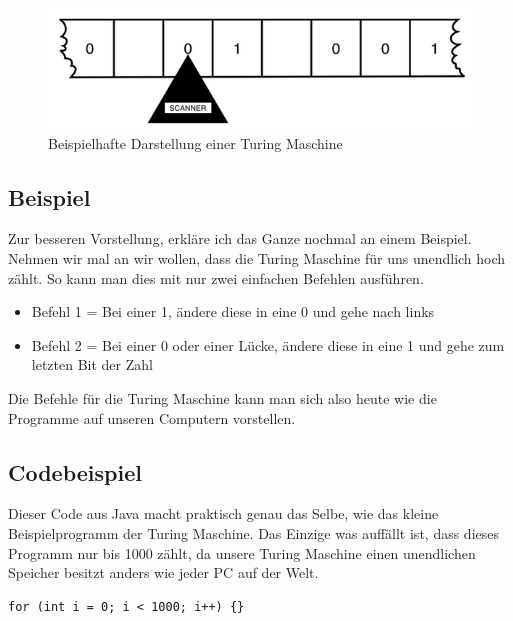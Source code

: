 \begin{figure}[hbtp]
\centering
\includegraphics[scale=1]{TuringmashinePicture.png}
\caption{Beispielhafte Darstellung einer Turing Maschine\cite{theessentialturing}}
\end{figure}

\subsection{Beispiel} Zur besseren Vorstellung, erkläre ich das Ganze nochmal an einem Beispiel. Nehmen wir mal an wir wollen, dass die Turing Maschine für uns unendlich hoch zählt. So kann man dies mit nur zwei einfachen Befehlen ausführen. 

\begin{itemize}
\item Befehl 1 = Bei einer 1, ändere diese in eine 0 und gehe nach links 
\item Befehl 2 = Bei einer 0 oder einer Lücke, ändere diese in eine 1 und gehe zum letzten Bit der Zahl 
\end{itemize}

Die Befehle für die Turing Maschine kann man sich also heute wie die Programme auf unseren Computern vorstellen.

\subsection{Codebeispiel}
Dieser Code aus Java macht praktisch genau das Selbe, wie das kleine Beispielprogramm der Turing Maschine. Das Einzige was auffällt ist, dass dieses Programm nur bis 1000 zählt, da unsere Turing Maschine einen unendlichen Speicher besitzt anders wie jeder PC auf der Welt.

\begin{verbatim}
for (int i = 0; i < 1000; i++) {}			
\end{verbatim}